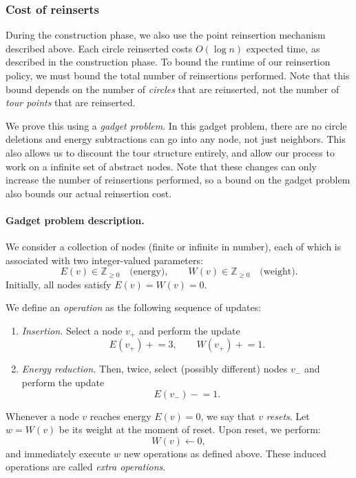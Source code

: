\documentclass[11pt]{article}
\begin{document}
\subsubsection{Cost of reinserts}
During the construction phase, we also use the point reinsertion mechanism described above. Each circle reinserted costs $O(\log n)$ expected time, as described in the construction phase. To bound the runtime of our reinsertion policy, we must bound the total number of reinsertions performed. Note that this bound depends on the number of \emph{circles} that are reinserted, not the number of \emph{tour points} that are reinserted.

We prove this using a \emph{gadget problem}. In this gadget problem, there are no circle deletions and energy subtractions can go into any node, not just neighbors. This also allows us to discount the tour structure entirely, and allow our process to work on a infinite set of abstract nodes. Note that these changes can only increase the number of reinsertions performed, so a bound on the gadget problem also bounds our actual reinsertion cost.

\paragraph{Gadget problem description.}
We consider a collection of nodes (finite or infinite in number), each of which is associated with two integer-valued parameters:
\[
E(v) \in \mathbb{Z}_{\ge 0} \quad \text{(energy)}, \qquad
W(v) \in \mathbb{Z}_{\ge 0} \quad \text{(weight)}.
\]
Initially, all nodes satisfy $E(v) = W(v) = 0$.

We define an \emph{operation} as the following sequence of updates:
\begin{enumerate}
    \item \emph{Insertion.} Select a node $v_+$ and perform the update
    \[
    E(v_+) \mathrel{+}= 3, \qquad W(v_+) \mathrel{+}= 1.
    \]
    \item \emph{Energy reduction.} Then, twice, select (possibly different) nodes $v_-$ and perform the update
    \[
    E(v_-) \mathrel{-}= 1.
    \]
\end{enumerate}

Whenever a node $v$ reaches energy $E(v) = 0$, we say that $v$ \emph{resets}.
Let $w = W(v)$ be its weight at the moment of reset.
Upon reset, we perform:
\[
W(v) \gets 0,
\]
and immediately execute $w$ new operations as defined above.
These induced operations are called \emph{extra operations}.
\end{document}
